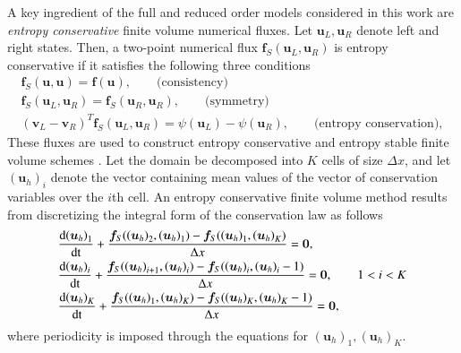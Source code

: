 \documentclass[preprint,10pt]{elsarticle}
\theoremstyle{definition}
\theoremstyle{lemma}
\theoremstyle{theorem}
\theoremstyle{assumption}
\newcommand{\td}[2]{\frac{{\rm d}#1}{{\rm d}{\rm #2}}}
\newcommand{\LRp}[1]{\left( #1 \right)}
\begin{document}
A key ingredient of the full and reduced order models considered in this work are \textit{entropy conservative} finite volume numerical fluxes.  Let $\bm{u}_L, \bm{u}_R$ denote left and right states.  Then, a two-point numerical flux $\bm{f}_S(\bm{u}_L, \bm{u}_R)$ is entropy conservative if it satisfies the following three conditions
\begin{gather}
\bm{f}_S(\bm{u},\bm{u}) = \bm{f}(\bm{u}), \qquad \text{(consistency)} \label{eq:esflux}\\
\bm{f}_S(\bm{u}_L,\bm{u}_R) = \bm{f}_S(\bm{u}_R,\bm{u}_R), \qquad \text{(symmetry)} \nonumber\\
\LRp{\bm{v}_L-\bm{v}_R}^T\bm{f}_S(\bm{u}_L,\bm{u}_R) = \psi(\bm{u}_L) - \psi(\bm{u}_R), \qquad \text{(entropy conservation)}\nonumber,
\end{gather}
These fluxes are used to construct entropy conservative and entropy stable finite volume schemes \cite{tadmor1987numerical, chandrashekar2013kinetic, ray2016entropy}.  Let the domain be decomposed into $K$ cells of size $\Delta x$, and let ${\LRp{\bm{u}_h}_i}$ denote the vector containing mean values of the vector of conservation variables over the $i$th cell.  An entropy conservative finite volume method results from discretizing the integral form of the conservation law as follows
\begin{align}
&\td{{\LRp{\bm{u}_h}_1}}{t} + \frac{\bm{f}_S({\LRp{\bm{u}_h}_2},\LRp{\bm{u}_h}_1)-\bm{f}_S({\LRp{\bm{u}_h}_1},{\LRp{\bm{u}_h}_K})}{\Delta x} = \bm{0}, \label{eq:nonlineqs1d}\\
&\td{{\LRp{\bm{u}_h}_i}}{t} + \frac{\bm{f}_S({\LRp{\bm{u}_h}_{i+1}},\LRp{\bm{u}_h}_i)-\bm{f}_S({\LRp{\bm{u}_h}_i},{\LRp{\bm{u}_h}_i-1})}{\Delta x} = \bm{0}, \qquad 1 < i < K \nonumber\\
&\td{{\LRp{\bm{u}_h}_K}}{t} + \frac{\bm{f}_S({\LRp{\bm{u}_h}_1},\LRp{\bm{u}_h}_K)-\bm{f}_S({\LRp{\bm{u}_h}_K},{\LRp{\bm{u}_h}_K-1})}{\Delta x} = \bm{0},\nonumber
\end{align}
where periodicity is imposed through the equations for ${\LRp{\bm{u}_h}_1}, {\LRp{\bm{u}_h}_K}$.  
\end{document}
